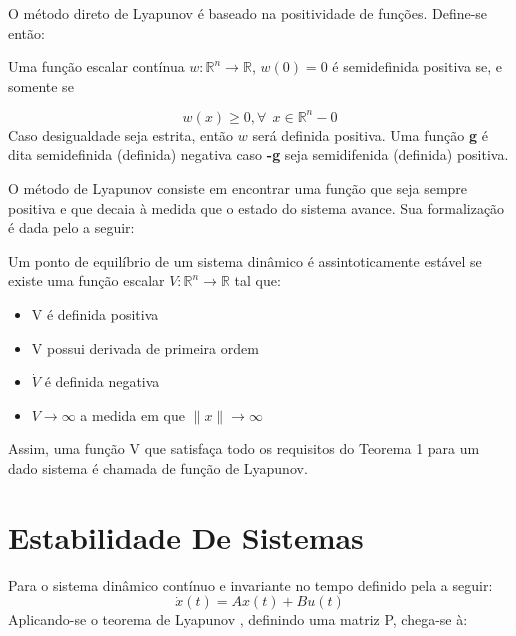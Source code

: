 O método direto de Lyapunov é baseado na positividade de funções. Define-se então:

\begin{mydef}
Uma função escalar contínua $w: \mathbb{R}^n \rightarrow \mathbb{R}$, $w(0) = 0$ é semidefinida positiva se, e somente se

	\begin{equation}
		w(x) \geq 0, \forall \ \ x \in \mathbb{R}^n - {0}
	\end{equation}
	Caso desigualdade seja estrita, então $w$ será definida positiva. Uma função \textbf{g} é dita semidefinida (definida) negativa caso \textbf{-g} seja semidifenida (definida) positiva.
\end{mydef}

O método de Lyapunov consiste em encontrar uma função que seja sempre positiva e que decaia à medida que o estado do sistema avance. Sua formalização é dada pelo  a seguir:

\begin{myteo} \label{teoLyapunov}
	Um ponto de equilíbrio de um sistema dinâmico é assintoticamente estável se existe uma função escalar $V : \mathbb{R}^n \rightarrow \mathbb{R} $ tal que:
	
	\begin{itemize}
		\item V é definida positiva
		\item V possui derivada de primeira ordem
		\item $\dot{V}$ é definida negativa
		\item $V \rightarrow \infty$ a medida em que $\|x\| \rightarrow \infty$
	\end{itemize}
\end{myteo}

Assim, uma função V que satisfaça todo os requisitos do Teorema 1 para um dado sistema é chamada de função de Lyapunov. 

\section{Estabilidade De Sistemas}
Para o sistema dinâmico contínuo e invariante no tempo definido pela  a seguir:
\begin{equation} \label{eqSisSimple}
	\dot{x}(t) = Ax(t) + Bu(t)
\end{equation}
Aplicando-se o teorema de Lyapunov \cite{wang}, definindo uma matriz P, chega-se à:


